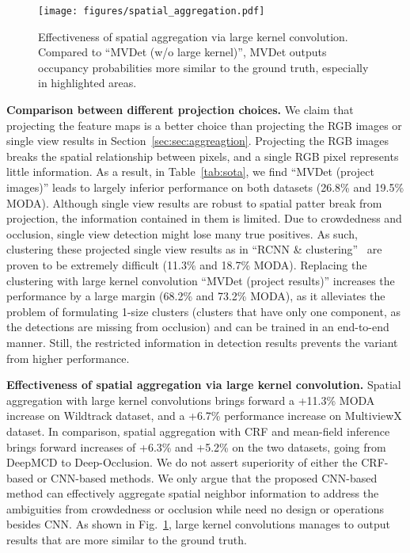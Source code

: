 \documentclass[runningheads]{llncs}
\begin{document}
\begin{figure}[t]
    
    \texttt{[image: figures/spatial\_aggregation.pdf]}
    \caption{Effectiveness of spatial aggregation via large kernel convolution. Compared to ``MVDet (w/o large kernel)'', MVDet outputs occupancy probabilities more similar to the ground truth, especially in highlighted areas.
    }
    \label{fig:spatial_aggregation}
\end{figure}




\textbf{Comparison between different projection choices.} 
We claim that projecting the feature maps is a better choice than projecting the RGB images or single view results in Section~\ref{sec:sec:aggreagtion}. 
Projecting the RGB images breaks the spatial relationship between pixels, and a single RGB pixel represents little information. As a result, in Table~\ref{tab:sota}, we find ``MVDet (project images)'' leads to largely inferior performance on both datasets (26.8\% and 19.5\% MODA). 
Although single view results are robust to spatial patter break from projection, the information contained in them is limited. Due to crowdedness and occlusion, single view detection might lose many true positives. As such, clustering these projected single view results as in ``RCNN \& clustering''~\cite{xu2016multi} are proven to be extremely difficult (11.3\% and 18.7\% MODA). 
Replacing the clustering with large kernel convolution ``MVDet (project results)'' increases the performance by a large margin (68.2\% and 73.2\% MODA), as it alleviates the problem of formulating 1-size clusters (clusters that have only one component, as the detections are missing from occlusion) and can be trained in an end-to-end manner. Still, the restricted information in detection results prevents the variant from higher performance. 







\textbf{Effectiveness of spatial aggregation via large kernel convolution.} 
Spatial aggregation with large kernel convolutions brings forward a +11.3\% MODA increase on Wildtrack dataset, and a +6.7\% performance increase on MultiviewX dataset. In comparison, spatial aggregation with CRF and mean-field inference brings forward increases of +6.3\% and +5.2\% on the two datasets, going from DeepMCD to Deep-Occlusion. 
We do not assert superiority of either the CRF-based or CNN-based methods. 
We only argue that the proposed CNN-based method can effectively aggregate spatial neighbor information to address the ambiguities from crowdedness or occlusion while need no design or operations besides CNN. As shown in Fig.~\ref{fig:spatial_aggregation}, large kernel convolutions manages to output results that are more similar to the ground truth. 
\end{document}
